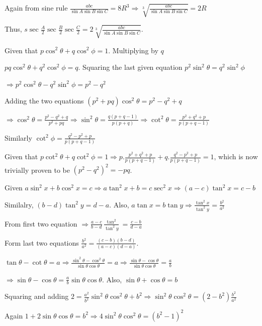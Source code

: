   Again from sine rule $\frac{abc}{\sin A\sin B\sin C} = 8R^3\Rightarrow \sqrt[3]{\frac{abc}{\sin A\sin
      B\sin C}} = 2R$

  Thus, $s\sec\frac{A}{2}\sec\frac{B}{2}\sec\frac{C}{2} = 2\sqrt[3]{\frac{abc}{\sin A\sin B\sin C}}$.
\item Given that $p\cos^2\theta + q\cos^2\phi = 1$. Multiplying by $q$

  $pq\cos^2\theta + q^2\cos^2\phi = q$. Squaring the last given equation $p^2\sin^2\theta = q^2\sin^2\phi$

  $\Rightarrow p^2\cos^2\theta - q^2\sin^2\phi = p^2 - q^2$

  Adding the two equations $\left(p^2 + pq\right)\cos^2\theta = p^2 - q^2 + q$

  $\Rightarrow \cos^2\theta = \frac{p^2 - q^2 + q}{p^2 + pq}\Rightarrow \sin^2\theta = \frac{q(p + q -
    1)}{p(p + q)}\Rightarrow \cot^2\theta = \frac{p^2 + q^2 + p}{p(p + q - 1)}$

  Similarly $\cot^2\phi = \frac{q^2 - p^2 + p}{p(p + q - 1)}$

  Given that $p\cot^2\theta + q\cot^2\phi = 1 \Rightarrow p.\frac{p^2 + q^2 + p}{p(p + q - 1)} + q.\frac{q^2
    - p^2 + p}{p(p + q - 1)} = 1$, which is now trivially proven to be $\left(p^2 - q^2\right)^2 = -pq$.
\item Given $a\sin^2x + b\cos^2x = c \Rightarrow a\tan^2x + b = c\sec^2x \Rightarrow (a - c)\tan^2x = c - b$

  Similalry, $(b - d)\tan^2y = d - a$. Also, $a\tan x = b\tan y \Rightarrow \frac{\tan^2x}{\tan^2y}
  = \frac{b^2}{a^2}$

  From first two equation $\Rightarrow \frac{a - c}{b - d}\frac{\tan^2}{\tan^2y} = \frac{c - b}{d - a}$

  Form last two equations $\frac{b^2}{a^2} = \frac{(c - b)(b - d)}{(a - c)(d - a)}$.
\item $\tan\theta - \cot\theta = a \Rightarrow \frac{\sin^2\theta - \cos^2\theta}{\sin\theta\cos\theta} =
  a\Rightarrow \frac{\sin\theta - \cos\theta}{\sin\theta\cos\theta} = \frac{a}{b}$

  $\Rightarrow \sin\theta - \cos\theta = \frac{a}{b}\sin\theta\cos\theta$. Also, $\sin\theta + \cos\theta =
  b$

  Squaring and adding $2 = \frac{a^2}{b^2}\sin^2\theta\cos^2\theta +
  b^2 \Rightarrow \sin^2\theta\cos^2\theta = \left(2 - b^2\right)\frac{b^2}{a^2}$

  Again $1 + 2\sin\theta\cos\theta = b^2 \Rightarrow 4\sin^2\theta\cos^2\theta = \left(b^2 - 1\right)^2$

